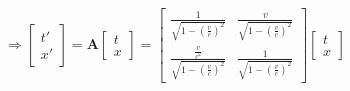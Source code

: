         \[\Rightarrow \begin{bmatrix}t' \\ x'\end{bmatrix} = \boldsymbol A \begin{bmatrix}t \\ x\end{bmatrix} = \begin{bmatrix}
            \frac{1}{\sqrt{1-\left( \frac{v}{c} \right)^{2}}} & \frac{v}{\sqrt{1-\left( \frac{v}{c} \right)^{2}}}\\
            \frac{\frac{v}{c^{2}}}{\sqrt{1-\left( \frac{v}{c} \right)^{2}}} & \frac{1}{\sqrt{1-\left( \frac{v}{c} \right)^{2}}}
        \end{bmatrix} \begin{bmatrix}t \\ x\end{bmatrix}\]
